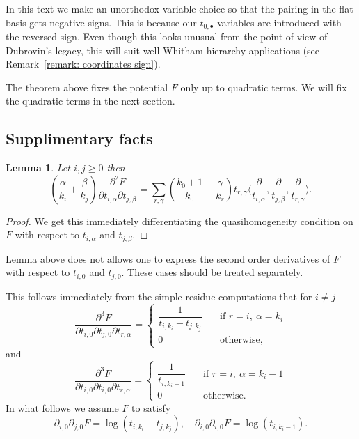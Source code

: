 \documentclass[12pt,a4paper]{amsart}
\newcommand{\p}{{\partial}}
\newcommand{\<}{\left<}
\renewcommand{\>}{\right>}
\newtheorem{lemma}[theorem]{Lemma}
\numberwithin{equation}{section}
\begin{document}
    In this text we make an unorthodox variable choice so that the pairing in the flat basis gets negative signs. This is because our $t_{0,\bullet}$ variables are introduced with the reversed sign. Even though this looks unusual from the point of view of Dubrovin's legacy, this will suit well Whitham hierarchy applications (see Remark~\ref{remark: coordinates sign}).

    The theorem above fixes the potential $F$ only up to quadratic terms. We will fix the quadratic terms in the next section.

\subsection{Supplimentary facts}

\begin{lemma}\label{lemma: sd}
    Let $i,j \ge 0$ then
    \[
        \left(\frac{\alpha}{k_i} + \frac{\beta}{k_j} \right) \frac{\p^2 F}{\p t_{i,\alpha}\p t_{j,\beta}} = \sum_{r,\gamma} ( \frac{k_0+1}{k_0} - \frac{\gamma}{k_r} ) t_{r,\gamma} \langle \frac{\p}{t_{i,\alpha}}, \frac{\p}{t_{j,\beta}}, \frac{\p}{t_{r,\gamma}} \rangle.
    \]
% 
\end{lemma}
\begin{proof}
    We get this immediately differentiating the quasihomogeneity condition on $F$ with respect to $t_{i,\alpha}$ and $t_{j,\beta}$.
\end{proof}

Lemma above does not allows one to express the second order derivatives of $F$ with respect to $t_{i,0}$ and $t_{j,0}$. These cases should be treated separately.

This follows immediately from the simple residue computations that for $i \neq j$
\[
    \frac{\p^3 F}{\p t_{i,0} \p t_{j,0} \p t_{r,\alpha}} = 
    \begin{cases}
        \dfrac{1}{t_{i,k_i}-t_{j,k_j}} \quad &\text{if } r=i,\ \alpha=k_i
        \\
        0 \quad & \text{otherwise},
    \end{cases}
\]
and
\[
    \frac{\p^3 F}{\p t_{i,0} \p t_{i,0} \p t_{r,\alpha}} = 
    \begin{cases}
        \dfrac{1}{t_{i,k_i-1}} \quad &\text{if } r=i,\ \alpha=k_i-1
        \\
        0 \quad & \text{otherwise}.
    \end{cases}
\]
In what follows we assume $F$ to satisfy
\begin{equation}\label{prop: simple 0 insertions}
     \p_{i,0}\p_{j,0} F = \log 
    (t_{i,k_i}-t_{j,k_j}), \quad \p_{i,0}\p_{i,0} F = \log  (t_{i,k_i-1}).
\end{equation}
\end{document}
